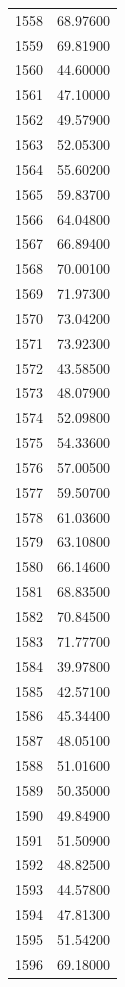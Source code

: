 \documentclass[
  letterpaper,
  DIV=11,
  numbers=noendperiod]{scrreprt}
\begin{document}
\begin{tcolorbox}
\begin{tabular}{lr}
1558 &         68.97600 \\
1559 &         69.81900 \\
1560 &         44.60000 \\
1561 &         47.10000 \\
1562 &         49.57900 \\
1563 &         52.05300 \\
1564 &         55.60200 \\
1565 &         59.83700 \\
1566 &         64.04800 \\
1567 &         66.89400 \\
1568 &         70.00100 \\
1569 &         71.97300 \\
1570 &         73.04200 \\
1571 &         73.92300 \\
1572 &         43.58500 \\
1573 &         48.07900 \\
1574 &         52.09800 \\
1575 &         54.33600 \\
1576 &         57.00500 \\
1577 &         59.50700 \\
1578 &         61.03600 \\
1579 &         63.10800 \\
1580 &         66.14600 \\
1581 &         68.83500 \\
1582 &         70.84500 \\
1583 &         71.77700 \\
1584 &         39.97800 \\
1585 &         42.57100 \\
1586 &         45.34400 \\
1587 &         48.05100 \\
1588 &         51.01600 \\
1589 &         50.35000 \\
1590 &         49.84900 \\
1591 &         51.50900 \\
1592 &         48.82500 \\
1593 &         44.57800 \\
1594 &         47.81300 \\
1595 &         51.54200 \\
1596 &         69.18000 \\

\end{tabular}
\end{tcolorbox}
\end{document}
